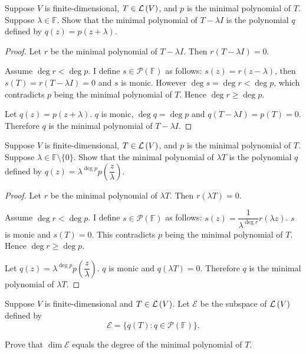 \begin{exercise}
    Suppose $V$ is finite-dimensional, $T \in \mathcal{L}\left({V}\right)$, and $p$ is the minimal polynomial of $T$. Suppose $\lambda \in \mathbb{F}$. Show that the minimal polynomial of $T - \lambda I$ is the polynomial $q$ defined by $q(z) = p(z + \lambda)$.
\end{exercise}

\begin{proof}
    Let $r$ be the minimal polynomial of $T - \lambda I$. Then $r(T - \lambda I) = 0$.

    Assume $\deg r < \deg p$. I define $s\in\mathscr{P}(\mathbb{F})$ as follows: $s(z) = r(z - \lambda)$, then $s(T) = r(T - \lambda I) = 0$ and $s$ is monic. However $\deg s = \deg r < \deg p$, which contradicts $p$ being the minimal polynomial of $T$. Hence $\deg r\geq \deg p$.

    Let $q(z) = p(z + \lambda)$. $q$ is monic, $\deg q = \deg p$ and $q(T - \lambda I) = p(T) = 0$. Therefore $q$ is the minimal polynomial of $T - \lambda I$.
\end{proof}
\newpage

\begin{exercise}
    Suppose $V$ is finite-dimensional, $T \in \mathcal{L}\left({V}\right)$, and $p$ is the minimal polynomial of $T$. Suppose $\lambda \in \mathbb{F}\setminus\{0\}$. Show that the minimal polynomial of $\lambda T$ is the polynomial $q$ defined by $q(z) = \lambda^{\deg p}p\left(\dfrac{z}{\lambda}\right)$.
\end{exercise}

\begin{proof}
    Let $r$ be the minimal polynomial of $\lambda T$. Then $r(\lambda T) = 0$.

    Assume $\deg r < \deg p$. I define $s\in\mathscr{P}(\mathbb{F})$ as follows: $s(z) = \dfrac{1}{\lambda^{\deg r}}r(\lambda z)$. $s$ is monic and $s(T) = 0$. This contradicts $p$ being the minimal polynomial of $T$. Hence $\deg r\geq \deg p$.

    Let $q(z) = \lambda^{\deg p}p\left(\dfrac{z}{\lambda}\right)$. $q$ is monic and $q(\lambda T) = 0$. Therefore $q$ is the minimal polynomial of $\lambda T$.
\end{proof}
\newpage

\begin{exercise}\label{chapter5:sectionB:exercise19}
    Suppose $V$ is finite-dimensional and $T\in\mathcal{L}\left({V}\right)$. Let $\mathcal{E}$ be the subspace of $\mathcal{L}\left({V}\right)$ defined by
    \[
        \mathcal{E} = \{ q(T): q\in\mathscr{P}(\mathbb{F}) \}.
    \]

    Prove that $\dim\mathcal{E}$ equals the degree of the minimal polynomial of $T$.
\end{exercise}

